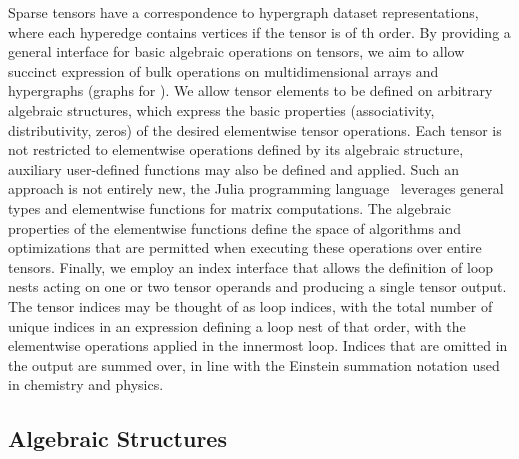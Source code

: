 

Sparse tensors have a correspondence to hypergraph dataset representations, where each hyperedge contains  vertices if the tensor is of th order.
By providing a general interface for basic algebraic operations on tensors, we aim to allow succinct expression of bulk operations on multidimensional arrays and hypergraphs (graphs for ).
We allow tensor elements to be defined on arbitrary algebraic structures, which express the basic properties (associativity, distributivity, zeros) of the desired elementwise tensor operations.
Each tensor is not restricted to elementwise operations defined by its algebraic structure, auxiliary user-defined functions may also be defined and applied. 
Such an approach is not entirely new, the Julia programming language~\cite{2012arXiv1209.5145B} leverages general types and elementwise functions for matrix computations.
The algebraic properties of the elementwise functions define the space of algorithms and optimizations that are permitted when executing these operations over entire tensors.
Finally, we employ an index interface that allows the definition of loop nests acting on one or two tensor operands and producing a single tensor output.
The tensor indices may be thought of as loop indices, with the total number of unique indices in an expression defining a loop nest of that order, with the elementwise operations applied in the innermost loop.
Indices that are omitted in the output are summed over, in line with the Einstein summation notation used in chemistry and physics.


\subsection{Algebraic Structures}
\label{subsec:algstrct}

